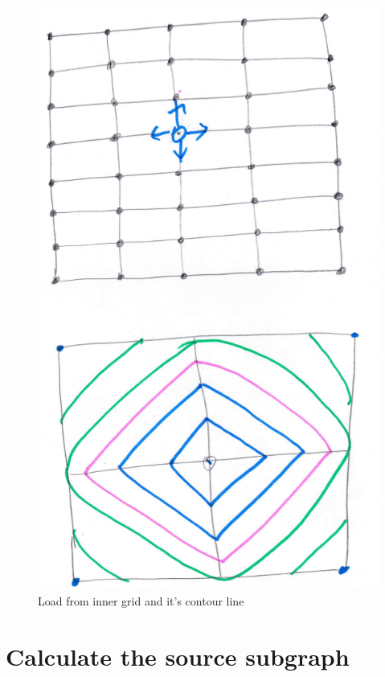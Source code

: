 \documentclass[preprint,12pt]{elsarticle}
\begin{document}
\begin{figure}[h]
\centering\includegraphics[width=0.8\linewidth]{inner}
\caption{Load from inner grid and it's contour line }
\label{inner1}
\end{figure}



\section{Calculate the source subgraph}
\end{document}
